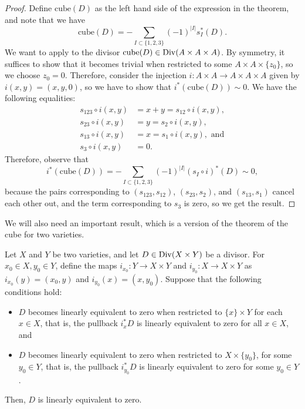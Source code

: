 \begin{proof}
	Define $\text{cube}(D)$ as the left hand side of the expression in the theorem, and note that we have
	\begin{equation*}
		\text{cube}(D)=-\sum_{I\subset\{1,2,3\}}(-1)^{|I|}s_I^*(D).
	\end{equation*}
	We want to apply  to the divisor $\text{cube}(D)\in\operatorname{Div}(A\times A\times A)$. By symmetry, it suffices to show that it becomes trivial when restricted to some $A\times A\times\{z_0\}$, so we choose $z_0=0$. Therefore, consider the injection $i:A\times A\rightarrow A\times A\times A$ given by $i(x,y)=(x,y,0)$, so we have to show that $i^*(\text{cube}(D))\sim 0$. We have the following equalities:
	\begin{align*}
		s_{123}\circ i(x,y)&=x+y=s_{12}\circ i(x,y),\\
		s_{23}\circ i(x,y)&=y=s_2\circ i(x,y),\\
		s_{13}\circ i(x,y)&=x=s_1\circ i(x,y), \text{ and}\\
		s_3\circ i(x,y)&=0.
	\end{align*}
	Therefore, observe that
	\begin{equation*}
		i^*(\text{cube}(D))=-\sum_{I\subset\{1,2,3\}}(-1)^{|I|}(s_I\circ i)^*(D)\sim 0,
	\end{equation*}
	because the pairs corresponding to $(s_{123},s_{12})$, $(s_{23},s_2)$, and $(s_{13},s_1)$ cancel each other out, and the term corresponding to $s_3$ is zero,	so we get the result.
\end{proof}
We will also need an important result, which is a version of the theorem of the cube for two varieties.
\begin{theorem}
	Let $X$ and $Y$ be two varieties, and let $D\in\operatorname{Div}(X\times Y)$ be a divisor. For $x_0\in X,y_0\in Y$, define the maps $i_{x_0}:Y\rightarrow X\times Y$ and $i_{y_0}:X\rightarrow X\times Y$ as $i_{x_0}(y)=(x_0,y)$ and $i_{y_0}(x)=(x,y_0)$. Suppose that the following conditions hold:
	\begin{itemize}
		\item[(a)] $D$ becomes linearly equivalent to zero when restricted to $\{x\}\times Y$ for each $x\in X$, that is, the pullback $i_x^*D$ is linearly equivalent to zero for all $x\in X$, and
		\item[(b)] $D$ becomes linearly equivalent to zero when restricted to $X\times\{y_0\}$, for some $y_0\in Y$, that is, the pullback $i_{y_0}^*D$ is linearly equivalent to zero for some $y_0\in Y$.
	\end{itemize}
	Then, $D$ is linearly equivalent to zero.
\end{theorem}
